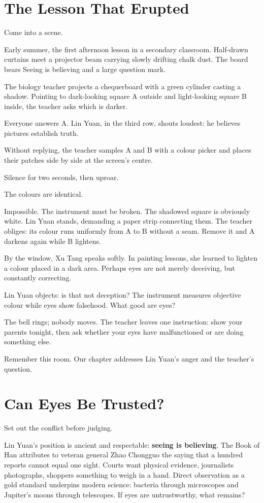 \section{The Lesson That Erupted}
Come into a scene.

Early summer, the first afternoon lesson in a secondary classroom. Half-drawn curtains meet a projector beam carrying slowly drifting chalk dust. The board bears Seeing is believing and a large question mark.

The biology teacher projects a chequerboard with a green cylinder casting a shadow. Pointing to dark-looking square A outside and light-looking square B inside, the teacher asks which is darker.

Everyone answers A. Lin Yuan, in the third row, shouts loudest: he believes pictures establish truth.

Without replying, the teacher samples A and B with a colour picker and places their patches side by side at the screen's centre.

Silence for two seconds, then uproar.

The colours are identical.

Impossible. The instrument must be broken. The shadowed square is obviously white. Lin Yuan stands, demanding a paper strip connecting them. The teacher obliges: its colour runs uniformly from A to B without a seam. Remove it and A darkens again while B lightens.

By the window, Xu Tang speaks softly. In painting lessons, she learned to lighten a colour placed in a dark area. Perhaps eyes are not merely deceiving, but constantly correcting.

Lin Yuan objects: is that not deception? The instrument measures objective colour while eyes show falsehood. What good are eyes?

The bell rings; nobody moves. The teacher leaves one instruction: show your parents tonight, then ask whether your eyes have malfunctioned or are doing something else.

Remember this room. Our chapter addresses Lin Yuan's anger and the teacher's question.

\section{Can Eyes Be Trusted?}
Set out the conflict before judging.

Lin Yuan's position is ancient and respectable: \textbf{seeing is believing}. The Book of Han attributes to veteran general Zhao Chongguo the saying that a hundred reports cannot equal one sight. Courts want physical evidence, journalists photographs, shoppers something to weigh in a hand. Direct observation as a gold standard underpins modern science: bacteria through microscopes and Jupiter's moons through telescopes. If eyes are untrustworthy, what remains?

